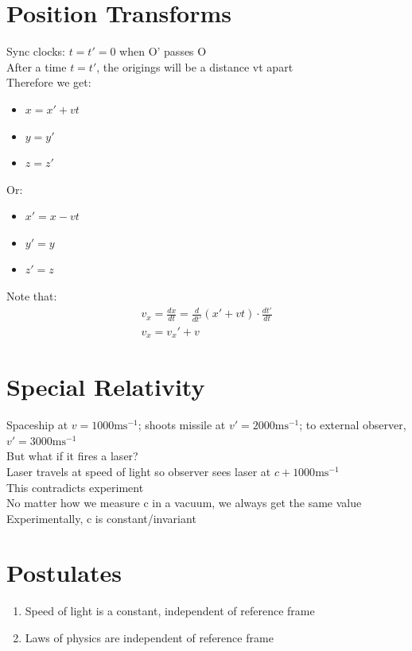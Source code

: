 \documentclass[a4paper, 11pt, fleqn, normalem]{report}
\begin{document}
\section{Position Transforms}
Sync clocks: $t = t' = 0$ when O' passes O \\
After a time $t = t'$,  the origings will be a distance vt apart \\
Therefore we get:
\begin{itemize}
    \item[] $x = x' + vt$
    \item[] $y = y'$
    \item[] $z = z'$
\end{itemize}
Or:
\begin{itemize}
    \item[] $x' = x - vt$
    \item[] $y' = y$
    \item[] $z' = z$
\end{itemize}
Note that:
\begin{gather*}
    v_{x} = \frac{dx}{dt} = \frac{d}{dt'}(x' + vt)\cdot\frac{dt'}{dt} \\
    v_{x} = v_{x}' + v
\end{gather*}

\section{Special Relativity}
Spaceship at $v = 1000\text{ms}^{-1}$; shoots missile at $v' = 2000\text{ms}^{-1}$; to external observer, $v' = 3000\text{ms}^{-1}$ \\
But what if it fires a laser? \\
Laser travels at speed of light so observer sees laser at $c + 1000\text{ms}^{-1}$ \\
This contradicts experiment \\
No matter how we measure c in a vacuum, we always get the same value \\
Experimentally, c is constant/invariant

\section{Postulates}
\begin{enumerate}
    \item Speed of light is a constant, independent of reference frame
    \item Laws of physics are independent of reference frame
\end{enumerate}
\end{document}
